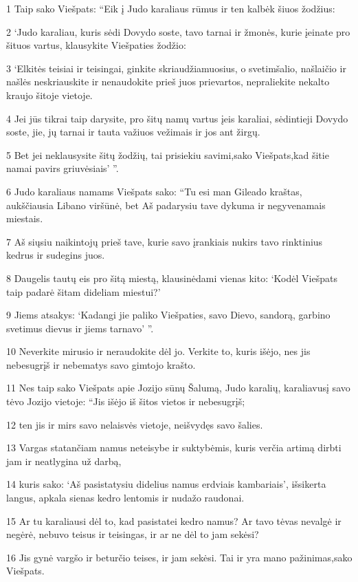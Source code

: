 \par 1 Taip sako Viešpats: “Eik į Judo karaliaus rūmus ir ten kalbėk šiuos žodžius: 
\par 2 ‘Judo karaliau, kuris sėdi Dovydo soste, tavo tarnai ir žmonės, kurie įeinate pro šituos vartus, klausykite Viešpaties žodžio: 
\par 3 ‘Elkitės teisiai ir teisingai, ginkite skriaudžiamuosius, o svetimšalio, našlaičio ir našlės neskriauskite ir nenaudokite prieš juos prievartos, nepraliekite nekalto kraujo šitoje vietoje. 
\par 4 Jei jūs tikrai taip darysite, pro šitų namų vartus įeis karaliai, sėdintieji Dovydo soste, jie, jų tarnai ir tauta važiuos vežimais ir jos ant žirgų. 
\par 5 Bet jei neklausysite šitų žodžių, tai prisiekiu savimi,­sako Viešpats,­kad šitie namai pavirs griuvėsiais’ ”. 
\par 6 Judo karaliaus namams Viešpats sako: “Tu esi man Gileado kraštas, aukščiausia Libano viršūnė, bet Aš padarysiu tave dykuma ir negyvenamais miestais. 
\par 7 Aš siųsiu naikintojų prieš tave, kurie savo įrankiais nukirs tavo rinktinius kedrus ir sudegins juos. 
\par 8 Daugelis tautų eis pro šitą miestą, klausinėdami vienas kito: ‘Kodėl Viešpats taip padarė šitam dideliam miestui?’ 
\par 9 Jiems atsakys: ‘Kadangi jie paliko Viešpaties, savo Dievo, sandorą, garbino svetimus dievus ir jiems tarnavo’ ”. 
\par 10 Neverkite mirusio ir neraudokite dėl jo. Verkite to, kuris išėjo, nes jis nebesugrįš ir nebematys savo gimtojo krašto. 
\par 11 Nes taip sako Viešpats apie Jozijo sūnų Šalumą, Judo karalių, karaliavusį savo tėvo Jozijo vietoje: “Jis išėjo iš šitos vietos ir nebesugrįš; 
\par 12 ten jis ir mirs savo nelaisvės vietoje, neišvydęs savo šalies. 
\par 13 Vargas statančiam namus neteisybe ir suktybėmis, kuris verčia artimą dirbti jam ir neatlygina už darbą, 
\par 14 kuris sako: ‘Aš pasistatysiu didelius namus erdviais kambariais’, išsikerta langus, apkala sienas kedro lentomis ir nudažo raudonai. 
\par 15 Ar tu karaliausi dėl to, kad pasistatei kedro namus? Ar tavo tėvas nevalgė ir negėrė, nebuvo teisus ir teisingas, ir ar ne dėl to jam sekėsi? 
\par 16 Jis gynė vargšo ir beturčio teises, ir jam sekėsi. Tai ir yra mano pažinimas,­sako Viešpats.­ 
